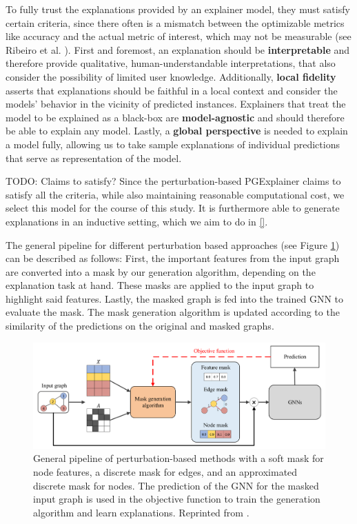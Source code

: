 To fully trust the explanations provided by an explainer model, they must satisfy certain criteria, since there often is a mismatch between the optimizable metrics like accuracy and the actual metric of interest, which may not be measurable (see Ribeiro et al. \cite{ribeiro2016should}). First and foremost, an explanation should be \textbf{interpretable} and therefore provide qualitative, human-understandable interpretations, that also consider the possibility of limited user knowledge. Additionally, \textbf{local fidelity} asserts that explanations should be faithful in a local context and consider the models' behavior in the vicinity of predicted instances. Explainers that treat the model to be explained as a black-box are \textbf{model-agnostic} and should therefore be able to explain any model. Lastly, a \textbf{global perspective} is needed to explain a model fully, allowing us to take sample explanations of individual predictions that serve as representation of the model.

TODO: Claims to satisfy?
Since the perturbation-based PGExplainer \cite{luo2020parameterized} claims to satisfy all the criteria, while also maintaining reasonable computational cost, we select this model for the course of this study. It is furthermore able to generate explanations in an inductive setting, which we aim to do in \ref{}.

The general pipeline for different perturbation based approaches (see Figure \ref{fig:perturbation_pipeline}) can be described as follows: First, the important features from the input graph are converted into a mask by our generation algorithm, depending on the explanation task at hand. These masks are applied to the input graph to highlight said features. Lastly, the masked graph is fed into the trained GNN to evaluate the mask. The mask generation algorithm is updated according to the similarity of the predictions on the original and masked graphs. 

\begin{figure}
    \includegraphics[width=\textwidth]{img/perturbation_pipeline.png}
    \caption[General pipeline of perturbation-based explainability methods]{\small General pipeline of perturbation-based methods with a soft mask for node features, a discrete mask for edges, and an approximated discrete mask for nodes. The prediction of the GNN for the masked input graph is used in the objective function to train the generation algorithm and learn explanations. Reprinted from \cite{yuan2022explainability}.}
    \label{fig:perturbation_pipeline}
\end{figure}

